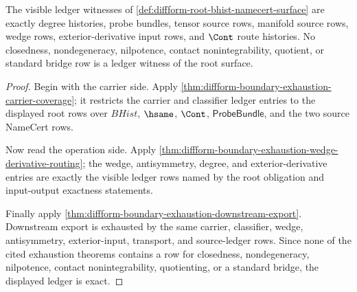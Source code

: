 \begin{theorem}
\label{thm:diffform-root-bhist-ledger-exactness-obligation}
The visible ledger witnesses of
\autoref{def:diffform-root-bhist-namecert-surface} are exactly degree
histories, probe bundles, tensor source rows, manifold source rows, wedge
rows, exterior-derivative input rows, and $\Cont$ route histories. No
closedness, nondegeneracy, nilpotence, contact nonintegrability, quotient, or
standard bridge row is a ledger witness of the root surface.
\end{theorem}
\begin{proof}
Begin with the carrier side. Apply
\autoref{thm:diffform-boundary-exhaustion-carrier-coverage}; it restricts the
carrier and classifier ledger entries to the displayed root rows over
$BHist$, $\hsame$, $\Cont$, $\mathsf{ProbeBundle}$, and the two source
NameCert rows.

Now read the operation side. Apply
\autoref{thm:diffform-boundary-exhaustion-wedge-derivative-routing}; the
wedge, antisymmetry, degree, and exterior-derivative entries are exactly the
visible ledger rows named by the root obligation and input-output exactness
statements.

Finally apply
\autoref{thm:diffform-boundary-exhaustion-downstream-export}. Downstream
export is exhausted by the same carrier, classifier, wedge, antisymmetry,
exterior-input, transport, and source-ledger rows. Since none of the cited
exhaustion theorems contains a row for closedness, nondegeneracy, nilpotence,
contact nonintegrability, quotienting, or a standard bridge, the displayed
ledger is exact.
\end{proof}

